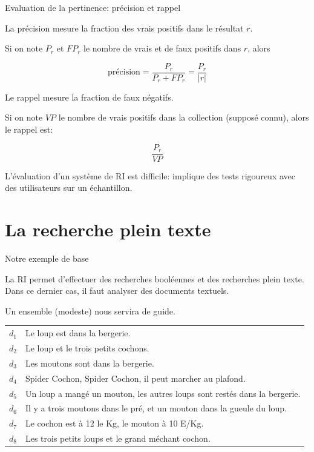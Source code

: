 \begin{frame}{Evaluation de la pertinence: précision et rappel}

La \alert{précision} mesure la fraction des vrais positifs dans le résultat $r$.

\medskip

  Si on note $P_r$ et $FP_r$ le nombre de vrais
   et de faux positifs dans $r$, alors
   
  $$\text{précision} = \frac{P_r}{P_r + FP_r} = \frac{P_r}{|r|}$$

\vfill

   Le \alert{rappel} mesure la fraction de faux négatifs. 
   
\medskip
   Si on note $VP$ le
   nombre de vrais positifs \alert{dans la collection} (supposé connu), alors  le rappel est:
   
   $$\frac{P_r}{VP}$$
   
   \vfill
   
   L'évaluation d'un système de RI est difficile: implique des tests rigoureux avec des utilisateurs
   sur un échantillon.

\end{frame}

\section{La recherche plein texte}


\begin{frame}{Notre exemple de base}

La RI permet d'effectuer des recherches \alert{booléennes} et des
recherches \alert{plein texte}. Dans ce dernier cas, il faut \alert{analyser}
des documents textuels.

\vspace{.5cm}

Un ensemble (modeste) nous servira de guide.

\vspace{.5cm}


\begin{tabular}{>{\color{structure.fg}}ll}
     $d_1$&Le loup est dans la bergerie.\\
     $d_2$&Le loup et le trois petits cochons.\\
     $d_3$&Les moutons sont dans la bergerie.\\
     $d_4$&Spider Cochon, Spider Cochon, il peut marcher au plafond.\\
     $d_5$&Un loup a mangé un mouton, les autres loups sont restés dans la bergerie.\\
     $d_6$&Il y a trois moutons dans le pré, et un mouton dans la gueule du loup.\\
     $d_7$&Le cochon est à 12 le Kg, le mouton à  10 E/Kg.\\
     $d_8$&Les trois petits loups et le grand méchant cochon.\\
\end{tabular}


\end{frame}

